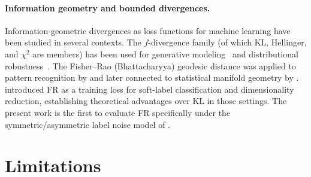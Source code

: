 \documentclass[11pt]{article}
\begin{document}
\paragraph{Information geometry and bounded divergences.}
Information-geometric divergences as loss functions for machine learning have
been studied in several contexts.
The $f$-divergence family (of which KL, Hellinger, and $\chi^2$ are members)
has been used for generative modeling~\citep{nowozin2016fgan} and
distributional robustness~\citep{duchi2021learning}.
The Fisher--Rao (Bhattacharyya) geodesic distance was applied to pattern
recognition by \citet{rao1945information} and later connected to statistical
manifold geometry by \citet{amari2016information}.
\citet{bottoni2026fisherrao} introduced FR as a training loss for
soft-label classification and dimensionality reduction, establishing
theoretical advantages over KL in those settings.
The present work is the first to evaluate FR specifically under the
symmetric/asymmetric label noise model of \citet{ghosh2017robust}.

\section{Limitations}
\end{document}
